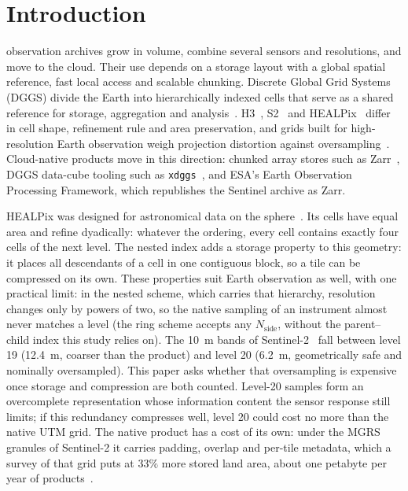 \section{Introduction}
\label{sec:intro}
 observation archives grow in volume, combine several
sensors and resolutions, and move to the cloud. Their use depends on a
storage layout with a global spatial reference, fast local access and
scalable chunking. Discrete Global Grid Systems (DGGS) divide the Earth into
hierarchically indexed cells that serve as a shared reference for storage,
aggregation and analysis~\cite{ogc_dggs,iso19170}. H3~\cite{h3},
S2~\cite{s2geometry} and HEALPix~\cite{gorski2005healpix} differ in cell
shape, refinement rule and area preservation, and grids built for
high-resolution Earth observation weigh projection distortion against
oversampling~\cite{bauermarschallinger2014equi7}. Cloud-native products move
in this direction: chunked array stores such as Zarr~\cite{moore2023zarr},
DGGS data-cube tooling such as
\texttt{xdggs}~\cite{kmoch2024xdggs}, and ESA's Earth Observation
Processing Framework, which republishes the Sentinel archive as Zarr.

HEALPix was designed for astronomical data on the
sphere~\cite{gorski2005healpix}. Its cells have equal area and refine
dyadically: whatever the ordering, every cell contains exactly four
cells of the next level. The nested index adds a storage property to
this geometry: it places all descendants of a cell in one contiguous
block, so a tile can be compressed on its own. These properties suit
Earth observation as well, with one practical limit: in the nested
scheme, which carries that hierarchy, resolution changes only by powers
of two, so the native sampling of an instrument almost never matches a
level (the ring scheme accepts any $N_{\mathrm{side}}$, without the
parent--child index this study relies on). The \SI{10}{m} bands of
Sentinel-2~\cite{drusch2012sentinel2} fall between level 19
(\SI{12.4}{m}, coarser than the product) and level 20 (\SI{6.2}{m}, geometrically safe
and nominally oversampled). This paper asks whether that oversampling is
expensive once storage and compression are both counted. Level-20
samples form an overcomplete representation whose information content
the sensor response still limits; if this redundancy compresses well,
level 20 could cost no more than the native UTM grid. The native product
has a cost of its own: under the MGRS granules of Sentinel-2 it carries
padding, overlap and per-tile metadata, which a survey of that grid puts
at $33\%$ more stored land area, about one petabyte per year of
products~\cite{bauer2023wasting}.

